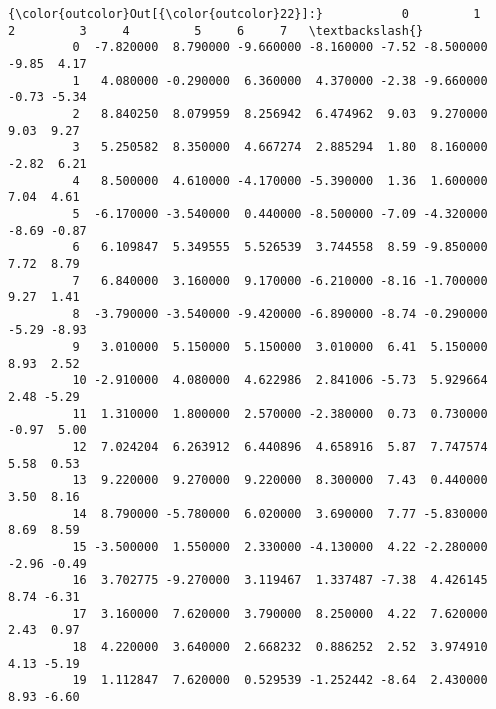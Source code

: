 \documentclass[11pt]{article}
\begin{document}
\begin{Verbatim}[commandchars=\\\{\}]
{\color{outcolor}Out[{\color{outcolor}22}]:}           0         1         2         3     4         5     6     7   \textbackslash{}
         0  -7.820000  8.790000 -9.660000 -8.160000 -7.52 -8.500000 -9.85  4.17   
         1   4.080000 -0.290000  6.360000  4.370000 -2.38 -9.660000 -0.73 -5.34   
         2   8.840250  8.079959  8.256942  6.474962  9.03  9.270000  9.03  9.27   
         3   5.250582  8.350000  4.667274  2.885294  1.80  8.160000 -2.82  6.21   
         4   8.500000  4.610000 -4.170000 -5.390000  1.36  1.600000  7.04  4.61   
         5  -6.170000 -3.540000  0.440000 -8.500000 -7.09 -4.320000 -8.69 -0.87   
         6   6.109847  5.349555  5.526539  3.744558  8.59 -9.850000  7.72  8.79   
         7   6.840000  3.160000  9.170000 -6.210000 -8.16 -1.700000  9.27  1.41   
         8  -3.790000 -3.540000 -9.420000 -6.890000 -8.74 -0.290000 -5.29 -8.93   
         9   3.010000  5.150000  5.150000  3.010000  6.41  5.150000  8.93  2.52   
         10 -2.910000  4.080000  4.622986  2.841006 -5.73  5.929664  2.48 -5.29   
         11  1.310000  1.800000  2.570000 -2.380000  0.73  0.730000 -0.97  5.00   
         12  7.024204  6.263912  6.440896  4.658916  5.87  7.747574  5.58  0.53   
         13  9.220000  9.270000  9.220000  8.300000  7.43  0.440000  3.50  8.16   
         14  8.790000 -5.780000  6.020000  3.690000  7.77 -5.830000  8.69  8.59   
         15 -3.500000  1.550000  2.330000 -4.130000  4.22 -2.280000 -2.96 -0.49   
         16  3.702775 -9.270000  3.119467  1.337487 -7.38  4.426145  8.74 -6.31   
         17  3.160000  7.620000  3.790000  8.250000  4.22  7.620000  2.43  0.97   
         18  4.220000  3.640000  2.668232  0.886252  2.52  3.974910  4.13 -5.19   
         19  1.112847  7.620000  0.529539 -1.252442 -8.64  2.430000  8.93 -6.60   
         

\end{Verbatim}
\end{document}
